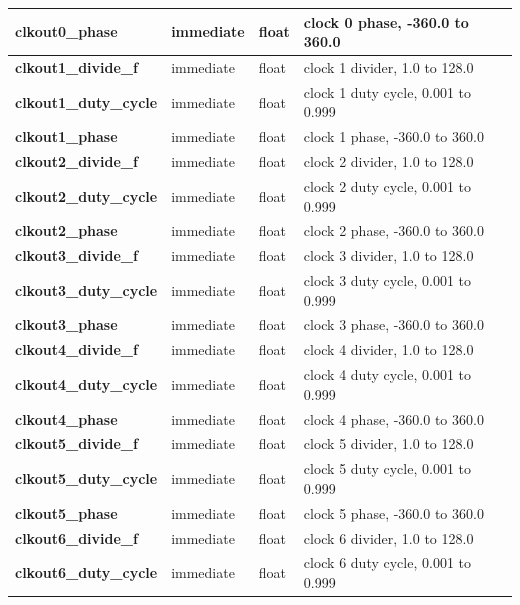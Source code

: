\begin{tabular}{| l | l | l | l |}
            {\bf clkout0\_phase}          & immediate & float & clock 0 phase, -360.0 to 360.0\\ \hline
            {\bf clkout1\_divide\_f}      & immediate & float & clock 1 divider, 1.0 to 128.0\\ \hline
            {\bf clkout1\_duty\_cycle}    & immediate & float & clock 1 duty cycle, 0.001 to 0.999\\ \hline
            {\bf clkout1\_phase}          & immediate & float & clock 1 phase, -360.0 to 360.0\\ \hline
            {\bf clkout2\_divide\_f}      & immediate & float & clock 2 divider, 1.0 to 128.0\\ \hline
            {\bf clkout2\_duty\_cycle}    & immediate & float & clock 2 duty cycle, 0.001 to 0.999\\ \hline
            {\bf clkout2\_phase}          & immediate & float & clock 2 phase, -360.0 to 360.0\\ \hline
            {\bf clkout3\_divide\_f}      & immediate & float & clock 3 divider, 1.0 to 128.0\\ \hline
            {\bf clkout3\_duty\_cycle}    & immediate & float & clock 3 duty cycle, 0.001 to 0.999\\ \hline
            {\bf clkout3\_phase}          & immediate & float & clock 3 phase, -360.0 to 360.0\\ \hline
            {\bf clkout4\_divide\_f}      & immediate & float & clock 4 divider, 1.0 to 128.0\\ \hline
            {\bf clkout4\_duty\_cycle}    & immediate & float & clock 4 duty cycle, 0.001 to 0.999\\ \hline
            {\bf clkout4\_phase}          & immediate & float & clock 4 phase, -360.0 to 360.0\\ \hline
            {\bf clkout5\_divide\_f}      & immediate & float & clock 5 divider, 1.0 to 128.0\\ \hline
            {\bf clkout5\_duty\_cycle}    & immediate & float & clock 5 duty cycle, 0.001 to 0.999\\ \hline
            {\bf clkout5\_phase}          & immediate & float & clock 5 phase, -360.0 to 360.0\\ \hline
            {\bf clkout6\_divide\_f}      & immediate & float & clock 6 divider, 1.0 to 128.0\\ \hline
            {\bf clkout6\_duty\_cycle}    & immediate & float & clock 6 duty cycle, 0.001 to 0.999\\ \hline

\end{tabular}
